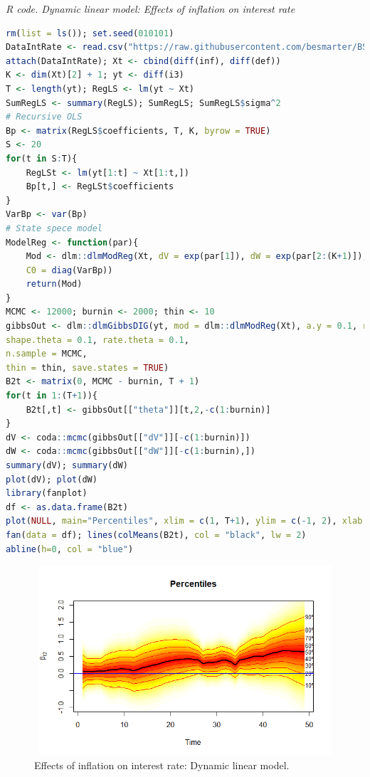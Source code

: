 \begin{tcolorbox}[enhanced,width=4.67in,center upper,
	fontupper=\large\bfseries,drop shadow southwest,sharp corners]
	\textit{R code. Dynamic linear model: Effects of inflation on interest rate}
	\begin{VF}
		\begin{lstlisting}[language=R]
rm(list = ls()); set.seed(010101)
DataIntRate <- read.csv("https://raw.githubusercontent.com/besmarter/BSTApp/refs/heads/master/DataApp/16INTDEF.csv", sep = ",", header = TRUE, quote = "")
attach(DataIntRate); Xt <- cbind(diff(inf), diff(def))
K <- dim(Xt)[2] + 1; yt <- diff(i3)
T <- length(yt); RegLS <- lm(yt ~ Xt)
SumRegLS <- summary(RegLS); SumRegLS; SumRegLS$sigma^2  
# Recursive OLS
Bp <- matrix(RegLS$coefficients, T, K, byrow = TRUE)
S <- 20
for(t in S:T){
	RegLSt <- lm(yt[1:t] ~ Xt[1:t,])
	Bp[t,] <- RegLSt$coefficients 
}
VarBp <- var(Bp)
# State spece model
ModelReg <- function(par){
	Mod <- dlm::dlmModReg(Xt, dV = exp(par[1]), dW = exp(par[2:(K+1)]), m0 = RegLS$coefficients,
	C0 = diag(VarBp))
	return(Mod)
}
MCMC <- 12000; burnin <- 2000; thin <- 10
gibbsOut <- dlm::dlmGibbsDIG(yt, mod = dlm::dlmModReg(Xt), a.y = 0.1, rate.y = 0.1,
shape.theta = 0.1, rate.theta = 0.1,
n.sample = MCMC,
thin = thin, save.states = TRUE)
B2t <- matrix(0, MCMC - burnin, T + 1)
for(t in 1:(T+1)){
	B2t[,t] <- gibbsOut[["theta"]][t,2,-c(1:burnin)] 
}
dV <- coda::mcmc(gibbsOut[["dV"]][-c(1:burnin)])
dW <- coda::mcmc(gibbsOut[["dW"]][-c(1:burnin),])
summary(dV); summary(dW)
plot(dV); plot(dW)
library(fanplot)
df <- as.data.frame(B2t)
plot(NULL, main="Percentiles", xlim = c(1, T+1), ylim = c(-1, 2), xlab = "Time", ylab = TeX("$\\beta_{t1}$"))
fan(data = df); lines(colMeans(B2t), col = "black", lw = 2)
abline(h=0, col = "blue")
\end{lstlisting}
	\end{VF}
\end{tcolorbox}

\begin{figure}[!h]
	\includegraphics[width=340pt, height=200pt]{Chapters/chapter8/figures/IntInf.png}
	\caption[List of figure caption goes here]{Effects of inflation on interest rate: Dynamic linear model.}\label{fig2}
\end{figure}


